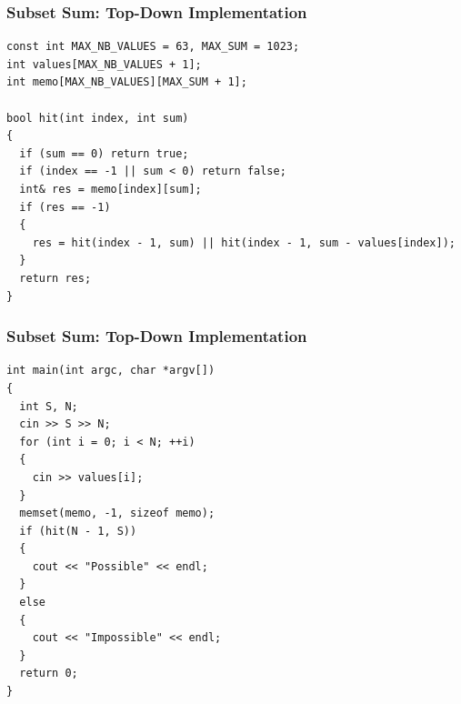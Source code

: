 \documentclass{beamer}
\begin{document}
\begin{frame}[containsverbatim]
\frametitle{Subset Sum: Top-Down Implementation}

\scriptsize
\begin{lstlisting}
const int MAX_NB_VALUES = 63, MAX_SUM = 1023;
int values[MAX_NB_VALUES + 1];
int memo[MAX_NB_VALUES][MAX_SUM + 1];

bool hit(int index, int sum)
{
  if (sum == 0) return true;
  if (index == -1 || sum < 0) return false;
  int& res = memo[index][sum];
  if (res == -1)
  {
    res = hit(index - 1, sum) || hit(index - 1, sum - values[index]);
  }
  return res;
}
\end{lstlisting}

\end{frame}

\begin{frame}[containsverbatim]
\frametitle{Subset Sum: Top-Down Implementation}

\scriptsize
\begin{lstlisting}
int main(int argc, char *argv[])
{
  int S, N;
  cin >> S >> N;
  for (int i = 0; i < N; ++i)
  {
    cin >> values[i];
  }
  memset(memo, -1, sizeof memo);
  if (hit(N - 1, S))
  {
    cout << "Possible" << endl;
  }
  else
  {
    cout << "Impossible" << endl;
  }
  return 0;
}
\end{lstlisting}

\end{frame}
\end{document}
